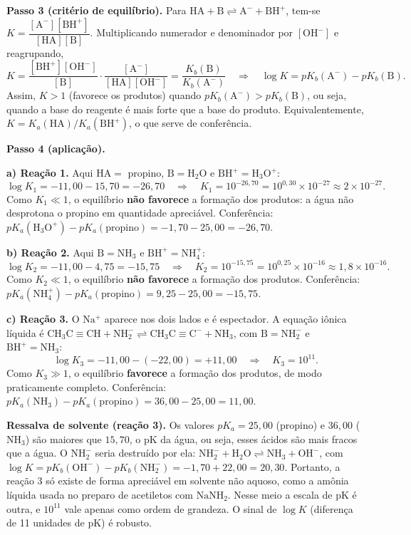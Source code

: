 \documentclass{article}%
\begin{document}
\textbf{Passo 3 (critério de equilíbrio).} Para $\mathrm{HA} + \mathrm{B} \rightleftharpoons \mathrm{A^-} + \mathrm{BH^+}$, tem-se $K = \dfrac{[\mathrm{A^-}][\mathrm{BH^+}]}{[\mathrm{HA}][\mathrm{B}]}$. Multiplicando numerador e denominador por $[\mathrm{OH^-}]$ e reagrupando,
\[
K = \frac{[\mathrm{BH^+}][\mathrm{OH^-}]}{[\mathrm{B}]}\cdot\frac{[\mathrm{A^-}]}{[\mathrm{HA}][\mathrm{OH^-}]} = \frac{K_b(\mathrm{B})}{K_b(\mathrm{A^-})}
\quad\Rightarrow\quad
\log K = pK_b(\mathrm{A^-}) - pK_b(\mathrm{B}).
\]
Assim, $K>1$ (favorece os produtos) quando $pK_b(\mathrm{A^-}) > pK_b(\mathrm{B})$, ou seja, quando a base do reagente é mais forte que a base do produto. Equivalentemente, $K = K_a(\mathrm{HA})/K_a(\mathrm{BH^+})$, o que serve de conferência.

\textbf{Passo 4 (aplicação).}

\textbf{a) Reação 1.} Aqui $\mathrm{HA} = $ propino, $\mathrm{B} = \mathrm{H_2O}$ e $\mathrm{BH^+} = \mathrm{H_3O^+}$:
\[
\log K_1 = -11{,}00 - 15{,}70 = -26{,}70
\quad\Rightarrow\quad
K_1 = 10^{-26{,}70} = 10^{0{,}30}\times10^{-27} \approx 2\times10^{-27}.
\]
Como $K_1 \ll 1$, o equilíbrio \textbf{não favorece} a formação dos produtos: a água não desprotona o propino em quantidade apreciável. Conferência: $pK_a(\mathrm{H_3O^+}) - pK_a(\mathrm{propino}) = -1{,}70 - 25{,}00 = -26{,}70$.

\textbf{b) Reação 2.} Aqui $\mathrm{B} = \mathrm{NH_3}$ e $\mathrm{BH^+} = \mathrm{NH_4^+}$:
\[
\log K_2 = -11{,}00 - 4{,}75 = -15{,}75
\quad\Rightarrow\quad
K_2 = 10^{-15{,}75} = 10^{0{,}25}\times10^{-16} \approx 1{,}8\times10^{-16}.
\]
Como $K_2 \ll 1$, o equilíbrio \textbf{não favorece} a formação dos produtos. Conferência: $pK_a(\mathrm{NH_4^+}) - pK_a(\mathrm{propino}) = 9{,}25 - 25{,}00 = -15{,}75$.

\textbf{c) Reação 3.} O $\mathrm{Na^+}$ aparece nos dois lados e é espectador. A equação iônica líquida é $\mathrm{CH_3C{\equiv}CH} + \mathrm{NH_2^-} \rightleftharpoons \mathrm{CH_3C{\equiv}C^-} + \mathrm{NH_3}$, com $\mathrm{B} = \mathrm{NH_2^-}$ e $\mathrm{BH^+} = \mathrm{NH_3}$:
\[
\log K_3 = -11{,}00 - (-22{,}00) = +11{,}00
\quad\Rightarrow\quad
K_3 = 10^{11}.
\]
Como $K_3 \gg 1$, o equilíbrio \textbf{favorece} a formação dos produtos, de modo praticamente completo. Conferência: $pK_a(\mathrm{NH_3}) - pK_a(\mathrm{propino}) = 36{,}00 - 25{,}00 = 11{,}00$.

\textbf{Ressalva de solvente (reação 3).} Os valores $pK_a = 25{,}00$ (propino) e $36{,}00$ ($\mathrm{NH_3}$) são maiores que $15{,}70$, o pK da água, ou seja, esses ácidos são mais fracos que a água. O $\mathrm{NH_2^-}$ seria destruído por ela: $\mathrm{NH_2^-} + \mathrm{H_2O} \rightleftharpoons \mathrm{NH_3} + \mathrm{OH^-}$, com $\log K = pK_b(\mathrm{OH^-}) - pK_b(\mathrm{NH_2^-}) = -1{,}70 + 22{,}00 = 20{,}30$. Portanto, a reação 3 só existe de forma apreciável em solvente não aquoso, como a amônia líquida usada no preparo de acetiletos com $\mathrm{NaNH_2}$. Nesse meio a escala de pK é outra, e $10^{11}$ vale apenas como ordem de grandeza. O sinal de $\log K$ (diferença de 11 unidades de pK) é robusto.
\end{document}
